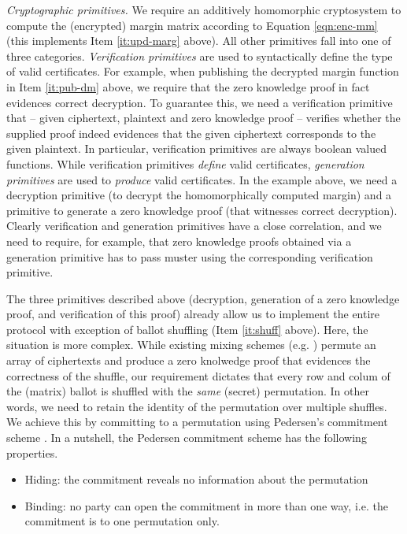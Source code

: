 \documentclass{llncs}
\begin{document}
\smallskip\noindent\emph{Cryptographic primitives.}
We require an additively homomorphic cryptosystem to
compute the (encrypted) margin matrix according to Equation
\ref{eqn:enc-mm} (this implements Item \ref{it:upd-marg} above). All
other primitives fall into one of three categories.
\emph{Verification primitives} are used to syntactically define
the type of valid certificates. For example, when publishing the
decrypted margin function in Item \ref{it:pub-dm} above, we require
that the zero knowledge proof in fact evidences correct decryption.
To
guarantee this, we need a verification primitive that -- given
ciphertext, plaintext and zero knowledge proof -- verifies whether the supplied proof
indeed evidences that the given ciphertext corresponds to the given
plaintext. In particular, verification primitives are always boolean
valued functions. While verification primitives \emph{define} valid
certificates, \emph{generation primitives} are used to
\emph{produce} valid certificates. In the example above, we need a
decryption primitive (to decrypt the homomorphically computed
margin) and a primitive to generate a zero knowledge proof (that
witnesses correct decryption). Clearly verification and generation
primitives have a close correlation, and we need to require, for
example, that zero knowledge proofs obtained via a generation
primitive has to pass muster using the corresponding verification
primitive. 

The three primitives described above (decryption, generation of a
zero knowledge proof, and verification of this proof) already allow
us  to implement the entire protocol with exception of ballot
shuffling (Item \ref{it:shuff} above).  Here, the situation is more
complex. While existing mixing schemes (e.g. \cite{Bayer:2012:EZK}) permute 
an array of ciphertexts and produce a zero knolwedge proof that
evidences the correctness of the shuffle, our requirement dictates
that every row and colum of the (matrix) ballot is
shuffled with the \emph{same} (secret) permutation.  In other words,
we need to retain the identity of the permutation over multiple
shuffles.  We achieve this by
committing to a permutation using Pedersen's commitment scheme
\cite{Pederson}.
In a nutshell, the Pedersen commitment scheme has the following properties. 
\begin{itemize}
\item Hiding: the commitment reveals no information about the
permutation
\item Binding: no party can open the commitment in more  
	 	than one way, i.e. the commitment is to one permutation only. 
\end{itemize}
\end{document}
